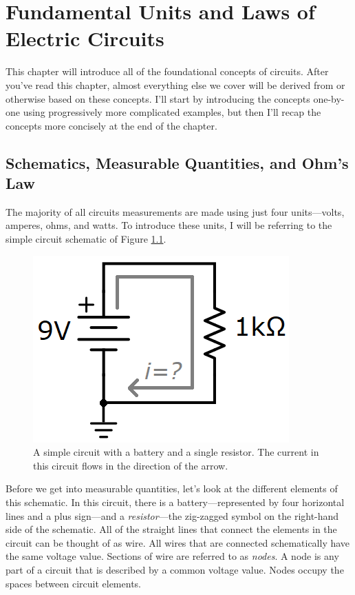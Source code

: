 \chapter{Fundamental Units and Laws of Electric Circuits}
\label{chap:fundamentals}
This chapter will introduce all of the foundational concepts of circuits. After you've read this chapter, almost everything else we cover will be derived from or otherwise based on these concepts. I'll start by introducing the concepts one-by-one using progressively more complicated examples, but then I'll recap the concepts more concisely at the end of the chapter.

\section{Schematics, Measurable Quantities, and Ohm's Law}
The majority of all circuits measurements are made using just four units---volts, amperes, ohms, and watts. To introduce these units, I will be referring to the simple circuit schematic of Figure \ref{resistorBatteryCircuit}.
\begin{figure}[h!]
\centering
\includegraphics{figures/batteryResistorCircuit.png}
\caption{A simple circuit with a battery and a single resistor. The current in this circuit flows in the direction of the arrow.}
\label{resistorBatteryCircuit}
\end{figure}
Before we get into measurable quantities, let's look at the different elements of this schematic. In this circuit, there is a battery---represented by four horizontal lines and a plus sign---and a \textit{resistor}---the zig-zagged symbol on the right-hand side of the schematic. All of the straight lines that connect the elements in the circuit can be thought of as wire. All wires that are connected schematically have the same voltage value. Sections of wire are referred to as \textit{nodes}. A node is any part of a circuit that is described by a common voltage value. Nodes occupy the spaces between circuit elements.

